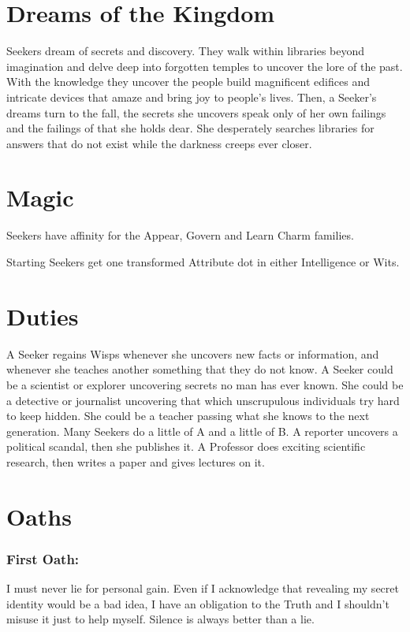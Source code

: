 \section*{Dreams of the Kingdom}

Seekers dream of secrets and discovery. They walk within libraries beyond imagination and delve deep into forgotten temples to uncover the lore of the past. With the knowledge they uncover the people build magnificent edifices and intricate devices that amaze and bring joy to people's lives. Then, a Seeker's dreams turn to the fall, the secrets she uncovers speak only of her own failings and the failings of that she holds dear. She desperately searches libraries for answers that do not exist while the darkness creeps ever closer. 

\section*{Magic}

Seekers have affinity for the Appear, Govern and Learn Charm families.

Starting Seekers get one transformed Attribute dot in either Intelligence or Wits. 

\section*{Duties}

A Seeker regains Wisps whenever she uncovers new facts or information, and whenever she teaches another something that they do not know. A Seeker could be a scientist or explorer uncovering secrets no man has ever known. She could be a detective or journalist uncovering that which unscrupulous individuals try hard to keep hidden. She could be a teacher passing what she knows to the next generation. Many Seekers do a little of A and a little of B. A reporter uncovers a political scandal, then she publishes it. A Professor does exciting scientific research, then writes a paper and gives lectures on it. 

\section*{Oaths}
\subsubsection*{First Oath:} I must never lie for personal gain. Even if I acknowledge that revealing my secret identity would be a bad idea, I have an obligation to the Truth and I shouldn't misuse it just to help myself. Silence is always better than a lie. 
